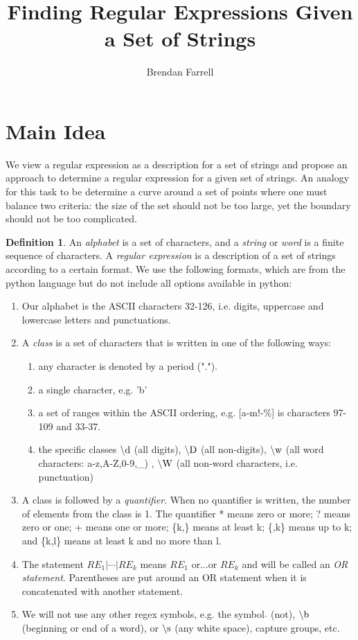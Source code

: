 \documentclass[11pt, oneside]{article}   	%
\title{Finding Regular Expressions Given a Set of Strings}
\author{Brendan Farrell}
\theoremstyle{definition}
\newtheorem{definition}{Definition}
\newcommand{\dre}{$\backslash \textnormal{d}$ }
\newcommand{\D}{$\backslash \textnormal{D}$ }
\newcommand{\w}{$\backslash \textnormal{w}$ }
\newcommand{\W}{$\backslash \textnormal{W}$ }
\begin{document}
\maketitle

\section{Main Idea}

We view a regular expression as a description for a set of strings and propose an approach to determine a regular expression for a given set of strings. 
An analogy for this task to be determine a curve around a set of points where one must balance two criteria: the size of the set should not be too large, yet the boundary should not be too complicated. 


\begin{definition}
An \textit{alphabet} is a set of characters, and a \textit{string} or \textit{word} is a finite sequence of characters. A \textit{regular expression} is a description of a set of strings according to a certain format. We use the following formats, which are from the python language but do not include all options available in python:
\begin{enumerate}
    \item Our alphabet is the ASCII characters 32-126, i.e. digits, uppercase and lowercase letters and punctuations. 
    \item A \textit{class} is a set of characters that is written in one of the following ways:
   \begin{enumerate}
   \item any character is denoted by a period (".").
   \item a single character, e.g. 'b'
   \item a set of ranges within the ASCII ordering, e.g. [a-m!-\%] is characters 97-109 and 33-37.
   \item the specific classes  \dre (all digits), \D (all non-digits), \w (all word characters: a-z,A-Z,0-9,\_) , \W (all non-word characters, i.e. punctuation)
   \end{enumerate}
   \item A class is followed by a \textit{quantifier}. When no quantifier is written, the number of elements from the class is 1. The quantifier * means zero or more; ? means zero or one; + means one or more; \{k,\} means at least k; \{,k\} means up to k; and \{k,l\} means at least k and no more than l.
   \item The statement $RE_1|\cdots |RE_k$ means  $RE_1$ or...or $RE_k$ and will be called an \textit{OR statement}. Parentheses are put around an OR statement when it is concatenated with another statement.
   \item We will not use any other regex symbols, e.g. the symbol $\hat{}$ (not), $\backslash \textnormal{b}$ (beginning or end of a word),  or $\backslash \textnormal{s}$ (any white space), capture groups, etc.
\end{enumerate}
\end{definition}
\end{document}
